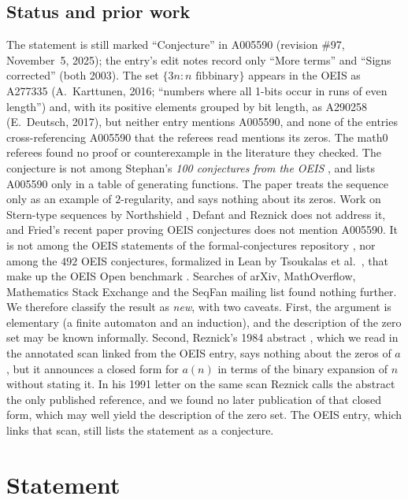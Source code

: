 \documentclass[11pt]{amsart}
\theoremstyle{plain}
\theoremstyle{definition}
\begin{document}
\subsection*{Status and prior work}
The statement is still marked ``Conjecture'' in A005590 (revision \#97, November~5, 2025); the entry's edit notes record only ``More terms'' and ``Signs corrected'' (both 2003).
The set $\{3n: n\text{ fibbinary}\}$ appears in the OEIS as A277335 (A.~Karttunen, 2016; ``numbers where all 1-bits occur in runs of even length'') and, with its positive elements grouped by bit length, as A290258 \cite{A290258} (E.~Deutsch, 2017), but neither entry mentions A005590, and none of the entries cross-referencing A005590 that the referees read mentions its zeros.
The math0 referees found no proof or counterexample in the literature they checked.
The conjecture is not among Stephan's \emph{100 conjectures from the OEIS} \cite{St04}, and \cite{St03} lists A005590 only in a table of generating functions.
The paper \cite{AS} treats the sequence only as an example of $2$-regularity, and \cite{AMF} says nothing about its zeros.
Work on Stern-type sequences by Northshield \cite{No}, Defant \cite{De} and Reznick \cite{Rez06} does not address it, and Fried's recent paper proving OEIS conjectures \cite{Fr} does not mention A005590.
It is not among the OEIS statements of the formal-conjectures repository \cite{FC}, nor among the $492$ OEIS conjectures, formalized in Lean by Tsoukalas et al.\ \cite{APN}, that make up the OEIS Open benchmark \cite{Ad}.
Searches of arXiv, MathOverflow, Mathematics Stack Exchange and the SeqFan mailing list found nothing further.
We therefore classify the result as \emph{new}, with two caveats.
First, the argument is elementary (a finite automaton and an induction), and the description of the zero set may be known informally.
Second, Reznick's 1984 abstract \cite{Rez84}, which we read in the annotated scan linked from the OEIS entry, says nothing about the zeros of $a$, but it announces a closed form for $a(n)$ in terms of the binary expansion of $n$ without stating it. In his 1991 letter on the same scan Reznick calls the abstract the only published reference, and we found no later publication of that closed form, which may well yield the description of the zero set. The OEIS entry, which links that scan, still lists the statement as a conjecture.

\section{Statement}\label{sec:statement}
\end{document}
